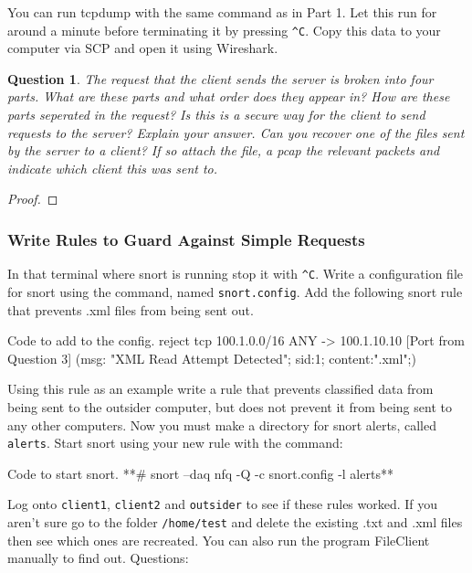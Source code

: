 \documentclass[a4paper,11pt,hidelinks]{article}
\newtheorem{theorem}{Question}[subsection]
\begin{document}
You can run tcpdump with the same command as in Part 1. Let this run for around a minute before terminating it by pressing \verb=^C=. Copy this data to your computer via SCP and open it using Wireshark. 

\begin{theorem}
    The request that the client sends the server is broken into four parts. What are these parts and what order does they appear in? How are these parts seperated in the request?
    Is this is a secure way for the client to send requests to the server? Explain your answer.
    Can you recover one of the files sent by the server to a client? If so attach the file, a pcap the relevant packets and indicate which client this was sent to.
\end{theorem}

\begin{proof}
\end{proof}

\subsubsection{Write Rules to Guard Against Simple Requests}

In that terminal where snort is running stop it with \verb=^C=. Write a configuration file for snort using the command, named \verb=snort.config=. Add the following snort rule that prevents .xml files from being sent out.

\begin{code}{Code to add to the config.}
reject tcp 100.1.0.0/16 ANY -> 100.1.10.10 [Port from Question 3]
    (msg: "XML Read Attempt Detected"; sid:1; content:".xml";)
\end{code}

Using this rule as an example write a rule that prevents classified data from being sent to the outsider computer, but does not prevent it from being sent to any other computers. Now you must make a directory for snort alerts, called \verb=alerts=. Start snort using your new rule with the command:

\begin{code}{Code to start snort.}
**# snort --daq nfq -Q -c snort.config -l alerts**
\end{code}

Log onto \verb=client1=, \verb=client2= and \verb=outsider= to see if these rules worked. If you aren't sure go to the folder \verb=/home/test= and delete the existing .txt and .xml files then see which ones are recreated. You can also run the program FileClient manually to find out.
Questions:
\end{document}
